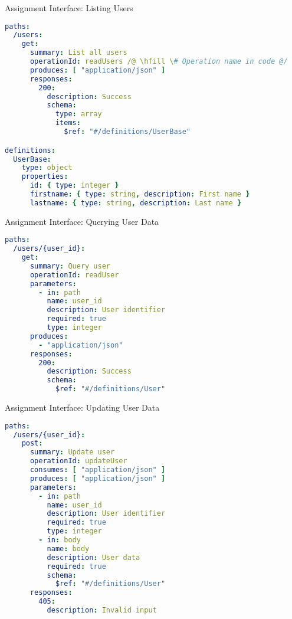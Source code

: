 \begin{frame}[fragile]{Assignment Interface: Listing Users}
\begin{lstlisting}[language=yaml,style=mini]
paths:
  /users:
    get:
      summary: List all users
      operationId: readUsers /@ \hfill \# Operation name in code @/
      produces: [ "application/json" ]
      responses:
        200:
          description: Success
          schema:
            type: array
            items:
              $ref: "#/definitions/UserBase"

definitions:
  UserBase:
    type: object
    properties:
      id: { type: integer }
      firstname: { type: string, description: First name }
      lastname: { type: string, description: Last name }
\end{lstlisting}
\end{frame}


\begin{frame}[fragile]{Assignment Interface: Querying User Data}
\begin{lstlisting}[language=yaml,style=mini]
paths:
  /users/{user_id}:
    get:
      summary: Query user
      operationId: readUser
      parameters:
        - in: path
          name: user_id
          description: User identifier
          required: true
          type: integer
      produces:
        - "application/json"
      responses:
        200:
          description: Success
          schema:
            $ref: "#/definitions/User"
\end{lstlisting}
\end{frame}


\begin{frame}[fragile]{Assignment Interface: Updating User Data}
\begin{lstlisting}[language=yaml,style=mini]
paths:
  /users/{user_id}:
    post:
      summary: Update user
      operationId: updateUser
      consumes: [ "application/json" ]
      produces: [ "application/json" ]
      parameters:
        - in: path
          name: user_id
          description: User identifier
          required: true
          type: integer
        - in: body
          name: body
          description: User data
          required: true
          schema:
            $ref: "#/definitions/User"
      responses:
        405:
          description: Invalid input
\end{lstlisting}
\end{frame}


